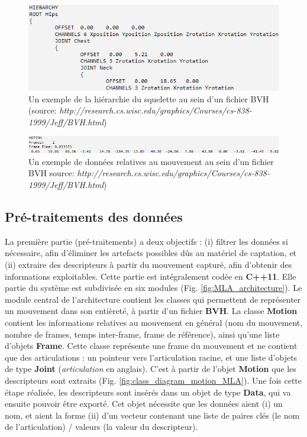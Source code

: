 \begin{figure}[h]
    \centering
    \includegraphics[width=\textwidth]{pictures/bvh_hierarchy.png}
    \caption[Exemple de squelette dans un fichier BVH]{Un exemple de la hiérarchie du squelette au sein d'un fichier BVH (source: \textit{http://research.cs.wisc.edu/graphics/Courses/cs-838-1999/Jeff/BVH.html})}
    \label{fig:bvh_hierarchy}
\end{figure}

\begin{figure}[h]
    \centering
    \includegraphics[width=\textwidth]{pictures/bvh_motion.png}
    \caption[Exemple de données de mouvement dans un fichier BVH]{Un exemple de données relatives au mouvement au sein d'un fichier BVH source: \textit{http://research.cs.wisc.edu/graphics/Courses/cs-838-1999/Jeff/BVH.html})}
    \label{fig:bvh_motion}
\end{figure}


\subsection{Pré-traitements des données}
La première partie (pré-traitements) a deux objectifs : (i) filtrer les données si nécessaire, afin d'éliminer les artefacts possibles dûs au matériel de captation, et (ii) extraire des descripteurs à partir du mouvement capturé, afin d'obtenir des informations exploitables. Cette partie est intégralement codée en \textbf{C++11}. Elle partie du système est subdivisée en six modules (Fig. \ref{fig:MLA_architecture}). Le module central de l'architecture contient les classes qui permettent de représenter un mouvement dans son entièreté, à partir d'un fichier \textbf{BVH}. La classe \textbf{Motion} contient les informations relatives au mouvement en général (nom du mouvement, nombre de frames, temps inter-frame, frame de référence), ainsi qu'une liste d'objets \textbf{Frame}. Cette classe représente une frame du mouvement et ne contient que des articulations : un pointeur vers l'articulation racine, et une liste d'objets de type \textbf{Joint} (\textit{articulation} en anglais). C'est à partir de l'objet \textbf{Motion} que les descripteurs sont extraits (Fig. \ref{fig:class_diagram_motion_MLA}). Une fois cette étape réalisée, les descripteurs sont insérés dans un objet de type \textbf{Data}, qui va ensuite pouvoir être exporté. Cet objet nécessite que les données aient (i) un nom, et aient la forme (ii) d'un vecteur contenant une liste de paires clés (le nom de l'articulation) / valeurs (la valeur du descripteur).


